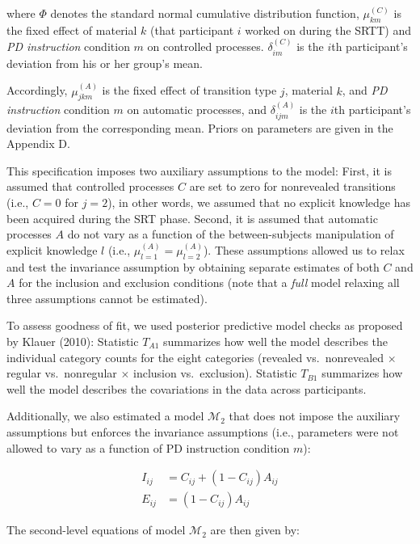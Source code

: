 \documentclass[floatsintext,doc]{apa6}
\theoremstyle{definition}
\theoremstyle{definition}
\theoremstyle{definition}
\theoremstyle{remark}
\begin{document}
where \(\Phi\) denotes the standard normal cumulative distribution
function, \(\mu_{km}^{(C)}\) is the fixed effect of material \(k\) (that
participant \(i\) worked on during the SRTT) and \emph{PD instruction}
condition \(m\) on controlled processes. \(\delta_{im}^{(C)}\) is the
\(i\)th participant's deviation from his or her group's mean.

Accordingly, \(\mu_{jkm}^{(A)}\) is the fixed effect of transition type
\(j\), material \(k\), and \emph{PD instruction} condition \(m\) on
automatic processes, and \(\delta_{ijm}^{(A)}\) is the \(i\)th
participant's deviation from the corresponding mean. Priors on
parameters are given in the Appendix D.

This specification imposes two auxiliary assumptions to the model:
First, it is assumed that controlled processes \(C\) are set to zero for
nonrevealed transitions (i.e., \(C=0\) for \(j=2\)), in other words, we
assumed that no explicit knowledge has been acquired during the SRT
phase. Second, it is assumed that automatic processes \(A\) do not vary
as a function of the between-subjects manipulation of explicit knowledge
\(l\) (i.e., \(\mu^{(A)}_{l=1} = \mu^{(A)}_{l=2}\)). These assumptions
allowed us to relax and test the invariance assumption by obtaining
separate estimates of both \(C\) and \(A\) for the inclusion and
exclusion conditions (note that a \emph{full} model relaxing all three
assumptions cannot be estimated).

To assess goodness of fit, we used posterior predictive model checks as
proposed by Klauer (2010): Statistic \(T_{A1}\) summarizes how well the
model describes the individual category counts for the eight categories
(revealed vs.~nonrevealed \(\times\) regular vs.~nonregular \(\times\)
inclusion vs.~exclusion). Statistic \(T_{B1}\) summarizes how well the
model describes the covariations in the data across participants.

Additionally, we also estimated a model \(\mathcal{M}_2\) that does not
impose the auxiliary assumptions but enforces the invariance assumptions
(i.e., parameters were not allowed to vary as a function of PD
instruction condition \(m\)):

\[
\begin{aligned}
  I_{ij} & =  C_{ij} + (1-C_{ij}) A_{ij}\\
  E_{ij} & =  (1-C_{ij}) A_{ij}
\end{aligned}
\]

The second-level equations of model \(\mathcal{M}_2\) are then given by:
\end{document}
